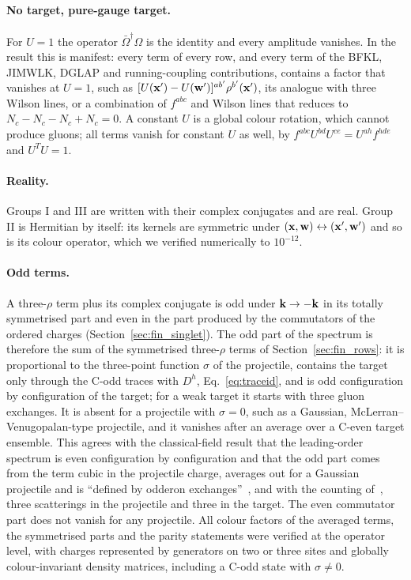 \paragraph{No target, pure-gauge target.} For $U=1$ the operator $\bar\Omega^\dagger\Omega$ is the identity and every amplitude vanishes. In the result this is manifest: every term of every row, and every term of the BFKL, JIMWLK, DGLAP and running-coupling contributions, contains a factor that vanishes at $U=1$, such as $[U(\mathbf{x}')-U(\mathbf{w}')]^{ab'}\rho^{b'}(\mathbf{x}')$, its analogue with three Wilson lines, or a combination of $f^{abc}$ and Wilson lines that reduces to $N_c-N_c-N_c+N_c=0$. A constant $U$ is a global colour rotation, which cannot produce gluons; all terms vanish for constant $U$ as well, by $f^{abc}U^{bd}U^{ce}=U^{ah}f^{hde}$ and $U^TU=1$.

\paragraph{Reality.} Groups I and III are written with their complex conjugates and are real. Group II is Hermitian by itself: its kernels are symmetric under $(\mathbf{x},\mathbf{w})\leftrightarrow(\mathbf{x}',\mathbf{w}')$ and so is its colour operator, which we verified numerically to $10^{-12}$.

\paragraph{Odd terms.} A three-$\rho$ term plus its complex conjugate is odd under $\mathbf{k}\to-\mathbf{k}$ in its totally symmetrised part and even in the part produced by the commutators of the ordered charges (Section~\ref{sec:fin_singlet}). The odd part of the spectrum is therefore the sum of the symmetrised three-$\rho$ terms of Section~\ref{sec:fin_rows}: it is proportional to the three-point function $\sigma$ of the projectile, contains the target only through the C-odd traces with $D^h$, Eq.~\eqref{eq:traceid}, and is odd configuration by configuration of the target; for a weak target it starts with three gluon exchanges. It is absent for a projectile with $\sigma=0$, such as a Gaussian, McLerran--Venugopalan-type projectile, and it vanishes after an average over a C-even target ensemble. This agrees with the classical-field result that the leading-order spectrum is even configuration by configuration and that the odd part comes from the term cubic in the projectile charge, averages out for a Gaussian projectile and is ``defined by odderon exchanges''~\cite{McLerran:2016snu}, and with the counting of~\cite{Kovchegov:2018jun}, three scatterings in the projectile and three in the target. The even commutator part does not vanish for any projectile. All colour factors of the averaged terms, the symmetrised parts and the parity statements were verified at the operator level, with charges represented by generators on two or three sites and globally colour-invariant density matrices, including a C-odd state with $\sigma\neq0$.

